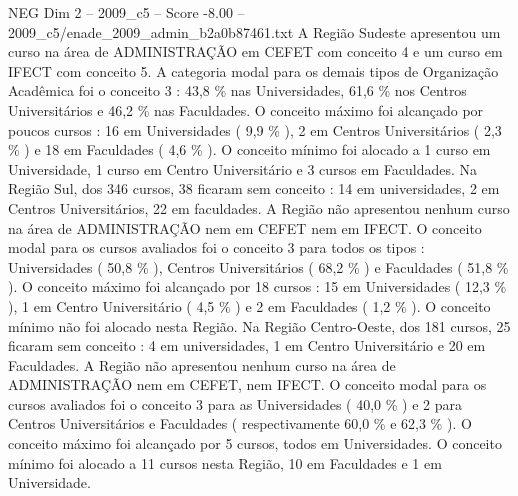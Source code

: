 \begin{textsample}{NEG Dim 2 – 2009\_c5 – Score -8.00 – 2009\_c5/enade\_2009\_admin\_b2a0b87461.txt}
A Região Sudeste apresentou um curso na área de ADMINISTRAÇÃO em CEFET com conceito 4 e um curso em IFECT com conceito 5.
A categoria modal para os demais tipos de Organização Acadêmica foi o conceito 3 : 43,8 \% nas Universidades, 61,6 \% nos Centros Universitários e 46,2 \% nas Faculdades.
O conceito máximo foi alcançado por poucos cursos : 16 em Universidades ( 9,9 \% ), 2 em Centros Universitários ( 2,3 \% ) e 18 em Faculdades ( 4,6 \% ).
O conceito mínimo foi alocado a 1 curso em Universidade, 1 curso em Centro Universitário e 3 cursos em Faculdades.
Na Região Sul, dos 346 cursos, 38 ficaram sem conceito : 14 em universidades, 2 em Centros Universitários, 22 em faculdades.
A Região não apresentou nenhum curso na área de ADMINISTRAÇÃO nem em CEFET nem em IFECT.
O conceito modal para os cursos avaliados foi o conceito 3 para todos os tipos : Universidades ( 50,8 \% ), Centros Universitários ( 68,2 \% ) e Faculdades ( 51,8 \% ).
O conceito máximo foi alcançado por 18 cursos : 15 em Universidades ( 12,3 \% ), 1 em Centro Universitário ( 4,5 \% ) e 2 em Faculdades ( 1,2 \% ).
O conceito mínimo não foi alocado nesta Região.
Na Região Centro-Oeste, dos 181 cursos, 25 ficaram sem conceito : 4 em universidades, 1 em Centro Universitário e 20 em Faculdades.
A Região não apresentou nenhum curso na área de ADMINISTRAÇÃO nem em CEFET, nem IFECT.
O conceito modal para os cursos avaliados foi o conceito 3 para as Universidades ( 40,0 \% ) e 2 para Centros Universitários e Faculdades ( respectivamente 60,0 \% e 62,3 \% ).
O conceito máximo foi alcançado por 5 cursos, todos em Universidades.
O conceito mínimo foi alocado a 11 cursos nesta Região, 10 em Faculdades e 1 em Universidade.

\end{textsample}
